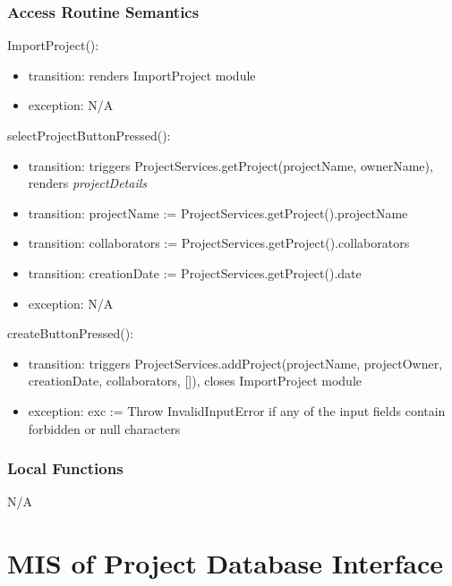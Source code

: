 \documentclass[12pt, titlepage]{article}
\begin{document}
	\subsubsection{Access Routine Semantics}
	
	\noindent ImportProject():
	\begin{itemize}
		\item transition: renders ImportProject module
		\item exception: N/A
	\end{itemize}
	
	\noindent selectProjectButtonPressed():
	\begin{itemize}
		\item transition: triggers ProjectServices.getProject(projectName, ownerName), renders \textit{projectDetails}
		\item transition: projectName := ProjectServices.getProject().projectName
		\item transition: collaborators := ProjectServices.getProject().collaborators
		\item transition: creationDate := ProjectServices.getProject().date
		\item exception: N/A
	\end{itemize}
	
	\noindent createButtonPressed():
	\begin{itemize}
		\item transition: triggers ProjectServices.addProject(projectName, projectOwner, creationDate, collaborators, []), closes ImportProject module
		\item exception: exc := Throw InvalidInputError if any of the input fields contain forbidden or null characters
	\end{itemize}
	
	\subsubsection{Local Functions}
	
	N/A
	
	\newpage
	
	\section{MIS of Project Database Interface} \label{Module} 
	
\end{document}
